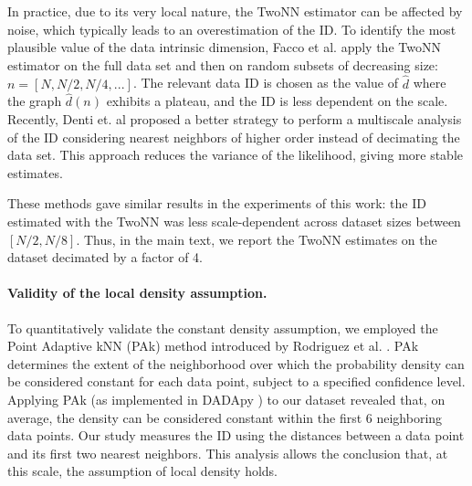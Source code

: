 \documentclass{article}
\begin{document}
In practice, due to its very local nature, the TwoNN estimator can be affected by noise, which typically leads to an overestimation of the ID. To identify the most plausible value of the data intrinsic dimension, Facco et al. apply the TwoNN estimator on the full data set and then on random subsets of decreasing size: $n = [N, N/2, N/4, ...]$. 
%
The relevant data ID is chosen as the value of $\hat{d}$ where the graph $\hat{d}(n)$ exhibits a plateau, and the ID is less dependent on the scale.
%
Recently, Denti et. al \cite{gride} proposed a better strategy to perform a multiscale analysis of the ID considering nearest neighbors of higher order instead of decimating the data set. 
This approach reduces the variance of the likelihood, giving more stable estimates.
%

These methods gave similar results in the experiments of this work: the ID estimated with the TwoNN was less scale-dependent across dataset sizes between $[N/2, N/8]$. Thus, in the main text, we report the TwoNN estimates on the dataset decimated by a factor of 4.

\paragraph{Validity of the local density assumption.}
To quantitatively validate the constant density assumption, we employed the Point Adaptive kNN (PAk) method introduced by Rodriguez et al. \cite{pak}. PAk determines the extent of the neighborhood over which the probability density can be considered constant for each data point, subject to a specified confidence level. Applying PAk (as implemented in DADApy \cite{dadapy}) to our dataset revealed that, on average, the density can be considered constant within the first 6 neighboring data points. Our study measures the ID using the distances between a data point and its first two nearest neighbors. This analysis allows the conclusion that, at this scale, the assumption of local density holds.

\clearpage 
\end{document}
